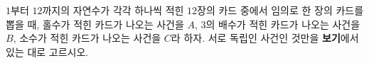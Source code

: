 $1$부터 $12$까지의 자연수가 각각 하나씩 적힌 $12$장의 카드 중에서 임의로 한 장의 카드를 뽑을 때, 홀수가 적힌 카드가 나오는 사건을 $A$, $3$의 배수가 적힌 카드가 나오는 사건을 $B$, 소수가 적힌 카드가 나오는 사건을 $C$라 하자. 서로 독립인 사건인 것만을 \textbf{보기}에서 있는 대로 고르시오. 
